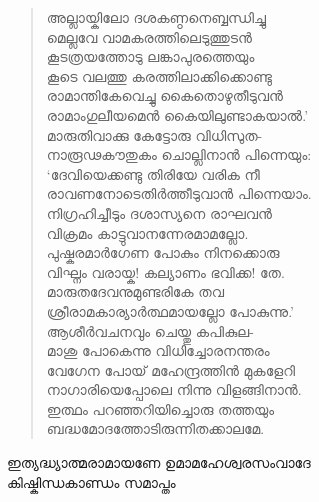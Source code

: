 \begin{verse}
അല്ലായ്കിലോ ദശകണ്ഠനെബ്ബന്ധിച്ചു\\
മെല്ലവേ വാമകരത്തിലെടുത്തുടന്‍\\
കൂടത്രയത്തോടു ലങ്കാപുരത്തെയും\\
കൂടെ വലത്തു കരത്തിലാക്കിക്കൊണ്ടു\\
രാമാന്തികേവെച്ചു കൈതൊഴുതീടുവന്‍\\
രാമാംഗുലീയമെന്‍ കൈയിലുണ്ടാകയാല്‍.’\\
മാരുതിവാക്കു കേട്ടോരു വിധിസുത-\\
നാരൂഢകൗതുകം ചൊല്ലിനാന്‍ പിന്നെയും:\\
‘ദേവിയെക്കണ്ടു തിരിയേ വരിക നീ\\
രാവണനോടെതിര്‍ത്തീടുവാന്‍ പിന്നെയാം.\\
നിഗ്രഹിച്ചീടും ദശാസ്യനെ രാഘവന്‍\\
വിക്രമം കാട്ടുവാനന്നേരമാമല്ലോ.\\
പുഷ്കരമാര്‍ഗേണ പോകും നിനക്കൊരു\\
വിഘ്നം വരായ്ക! കല്യാണം ഭവിക്ക! തേ.\\
മാരുതദേവനുമുണ്ടരികേ തവ\\
ശ്രീരാമകാര്യാര്‍ത്ഥമായല്ലോ പോകുന്നു.’\\
ആശീര്‍വചനവും ചെയ്തു കപികുല-\\
മാശു പോകെന്നു വിധിച്ചോരനന്തരം\\
വേഗേന പോയ് മഹേന്ദ്രത്തിന്‍ മുകളേറി\\
നാഗാരിയെപ്പോലെ നിന്നു വിളങ്ങിനാന്‍.\\
ഇത്ഥം പറഞ്ഞറിയിച്ചൊരു തത്തയും\\
ബദ്ധമോദത്തോടിരുന്നിതക്കാലമേ.
\end{verse}

\begin{center}
ഇത്യദ്ധ്യാത്മരാമായണേ ഉമാമഹേശ്വരസംവാദേ\\
കിഷ്കിന്ധകാണ്ഡം സമാപ്തം
\end{center}



